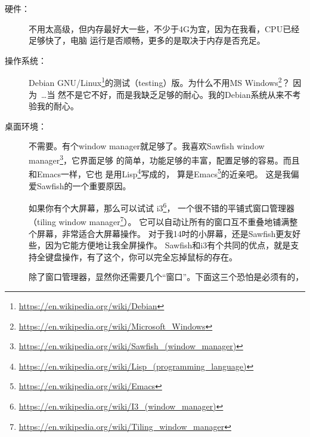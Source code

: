 \begin{description}
\item[硬件：]不用太高级，但内存最好大一些，不少于4G为宜，因为在我看，CPU已经足够快了，电脑
  运行是否顺畅，更多的是取决于内存是否充足。
\item[操作系统：]Debian
  GNU/Linux\footnote{\url{https://en.wikipedia.org/wiki/Debian}}的测试（testing）版。为什么不用MS
  Windows\footnote{\url{https://en.wikipedia.org/wiki/Microsoft_Windows}}？ 因为~\ldots 当
  然不是它不好，而是我缺乏足够的耐心。我的Debian系统从来不考验我的耐心。
\item[桌面环境：]不需要。有个window manager就足够了。我喜欢Sawfish window
  manager\footnote{\url{https://en.wikipedia.org/wiki/Sawfish_(window_manager)}}，它界面足够
  的简单，功能足够的丰富，配置足够的容易。而且和Emacs一样，它也
  是用Lisp\footnote{\url{https://en.wikipedia.org/wiki/Lisp_(programming_language)}}写成的，
  算是Emacs\footnote{\url{https://en.wikipedia.org/wiki/Emacs}}的近亲吧。
  这是我偏爱Sawfish的一个重要原因。

  如果你有个大屏幕，那么可以试试%
  i3\footnote{\url{https://en.wikipedia.org/wiki/I3_(window_manager)}}，%
  一个很不错的平铺式窗口管理器（tiling window %
  manager\footnote{\url{https://en.wikipedia.org/wiki/Tiling_window_manager}}）。%
  它可以自动让所有的窗口互不重叠地铺满整个屏幕，非常适合大屏幕操作。%
  对于我14吋的小屏幕，还是Sawfish更友好些，因为它能方便地让我全屏操作。
  Sawfish和i3有个共同的优点，就是支持全键盘操作，有了这个，你可以完全忘掉鼠标的存在。
  
  除了窗口管理器，显然你还需要几个“窗口”。下面这三个恐怕是必须有的，


\end{description}
